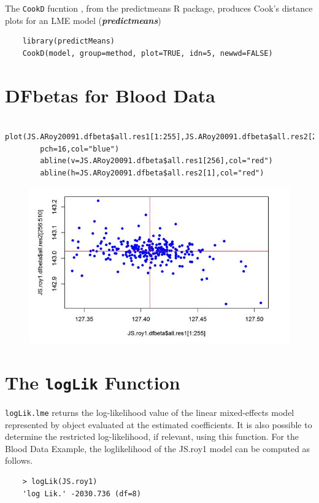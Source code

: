 \documentclass[12pt, a4paper]{report}
\begin{document}



The \texttt{CookD} fucntion , from the predictmeans R package, produces Cook’s distance plots for an LME model 
(\textbf{\textit{predictmeans}})



\begin{framed}
	\begin{verbatim}
	library(predictMeans)
	CookD(model, group=method, plot=TRUE, idn=5, newwd=FALSE)
	\end{verbatim}
\end{framed}


	\section{DFbetas for Blood Data}
	\begin{framed}
		\begin{verbatim}
		plot(JS.ARoy20091.dfbeta$all.res1[1:255],JS.ARoy20091.dfbeta$all.res2[256:510],
		pch=16,col="blue")
		abline(v=JS.ARoy20091.dfbeta$all.res1[256],col="red")
		abline(h=JS.ARoy20091.dfbeta$all.res2[1],col="red")
		\end{verbatim}
	\end{framed}
	\begin{figure}
		\centering
		\includegraphics[width=0.7\linewidth]{images/dfbetas-JS-Roy}
		\caption{}
		\label{fig:dfbetas-JS-ARoy2009}
	\end{figure}
	


\section{The \texttt{logLik} Function}
\texttt{logLik.lme} returns the log-likelihood value of the linear mixed-effects model represented by object evaluated at the estimated coefficients. It is also possible to determine the restricted log-likelihood, if relevant, using this function. For the Blood Data Example,  the loglikelihood of the JS.roy1 model can be computed as follows.
\begin{framed}
	\begin{verbatim}
	> logLik(JS.roy1)
	'log Lik.' -2030.736 (df=8)
	\end{verbatim}
\end{framed}
\end{document}
